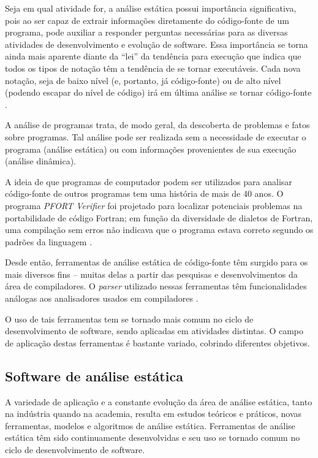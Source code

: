 Seja em qual atividade for, a análise estática possui importância
significativa, pois ao ser capaz de extrair informações diretamente do
código-fonte de um programa, pode auxiliar a responder perguntas necessárias
para as diversas atividades de desenvolvimento e evolução de software. Essa
importância se torna ainda mais aparente diante da ``lei'' da tendência para
execução que indica que todos os tipos de notação têm a tendência de se tornar
executáveis.  Cada nova notação, seja de baixo nível (e, portanto, já
código-fonte) ou de alto nível (podendo escapar do nível de código) irá em
última análise se tornar código-fonte \cite{harman2010why}.

A análise de programas trata, de modo geral, da descoberta de problemas e
fatos sobre programas. Tal análise pode ser realizada sem a necessidade de executar o
programa (análise estática) ou com informações provenientes de sua execução
(análise dinâmica).

A ideia de que programas de computador podem ser utilizados para analisar
código-fonte de outros programas tem uma história de mais de 40 anos.  O
programa {\it PFORT Verifier} \cite{ryder1974pfort} foi projetado para localizar potenciais
problemas na portabilidade de código Fortran; em função da diversidade de
dialetos de Fortran, uma compilação sem erros não indicava que o programa
estava correto segundo os padrões da linguagem \cite{wichmann1995industrial}.

Desde então, ferramentas de análise estática de código-fonte têm surgido para
os mais diversos fins -- muitas delas a partir das pesquisas e
desenvolvimentos da área de compiladores.  O {\it parser} utilizado nessas
ferramentas têm funcionalidades análogas aos analisadores usados em
compiladores \cite{anderson2008the}.

O uso de tais ferramentas tem se tornado mais comum no ciclo de desenvolvimento de
software, sendo aplicadas em atividades distintas.
O campo de aplicação destas ferramentas é bastante variado, cobrindo diferentes
objetivos.

\subsection{Software de análise estática}

A variedade de aplicação e a constante evolução da área de análise estática, 
tanto na indústria quando na academia, resulta em  estudos teóricos e práticos, novas ferramentas, modelos e
algoritmos de análise estática. Ferramentas de análise estática têm sido
continuamente desenvolvidas e seu uso se tornado comum no ciclo de desenvolvimento de
software.

